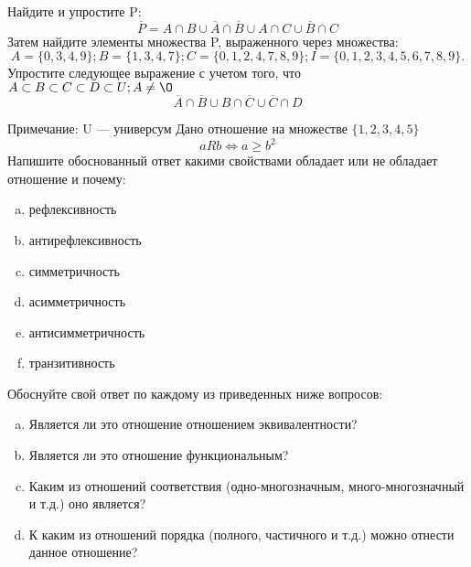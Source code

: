\documentclass[10pt]{exam}
\begin{document}
\begin{questions}
\question
Найдите и упростите P:
\begin{equation*}
\overline{P} = A \cap B \cup \overline{A} \cap \overline{B} \cup A \cap C \cup \overline{B} \cap C
\end{equation*}
Затем найдите элементы множества P, выраженного через множества:
\begin{equation*}
A = \{0, 3, 4, 9\}; 
B = \{1, 3, 4, 7\};
C = \{0, 1, 2, 4, 7, 8, 9\};
I = \{0, 1, 2, 3, 4, 5, 6, 7, 8, 9\}.
\end{equation*}\question
Упростите следующее выражение с учетом того, что $A\subset B \subset C \subset D \subset U; A \neq \O$
\begin{equation*}
\overline{A} \cap \overline{B} \cup B \cap \overline{C} \cup \overline{C} \cap D
\end{equation*}

Примечание: U — универсум\question
Дано отношение на множестве $\{1, 2, 3, 4, 5\}$ 
\begin{equation*}
aRb \iff a \geq b^2
\end{equation*}
Напишите обоснованный ответ какими свойствами обладает или не обладает отношение и почему:   
\begin{enumerate} [a)]\setcounter{enumi}{0}
\item рефлексивность
\item антирефлексивность
\item симметричность
\item асимметричность
\item антисимметричность
\item транзитивность
\end{enumerate}

Обоснуйте свой ответ по каждому из приведенных ниже вопросов:
\begin{enumerate} [a)]\setcounter{enumi}{0}
    \item Является ли это отношение отношением эквивалентности?
    \item Является ли это отношение функциональным?
    \item Каким из отношений соответствия (одно-многозначным, много-многозначный и т.д.) оно является?
    \item К каким из отношений порядка (полного, частичного и т.д.) можно отнести данное отношение?
\end{enumerate}



\end{questions}
\end{document}
